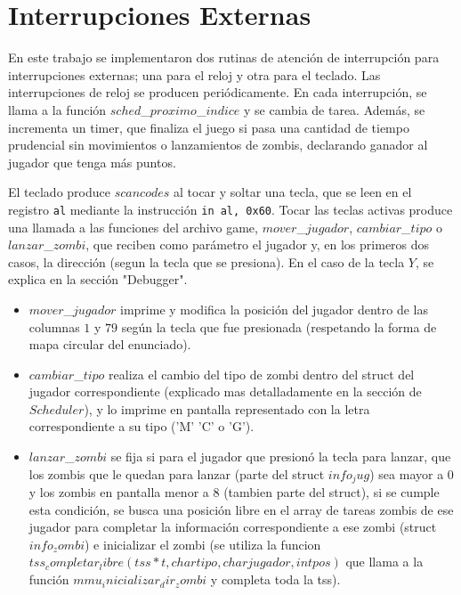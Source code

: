 \documentclass[a4paper]{article}
\begin{document}
\section{Interrupciones Externas} %
En este trabajo se implementaron dos rutinas de atención de interrupción para interrupciones externas; una para el reloj y otra para el teclado.
Las interrupciones de reloj se producen periódicamente. En cada interrupción, se llama a la función $sched$_$proximo$_$indice$ y se cambia de tarea. Además, se incrementa un timer, que finaliza el juego si pasa una cantidad de tiempo prudencial sin movimientos o lanzamientos de zombis, declarando ganador al jugador que tenga más puntos.

El teclado produce $scancodes$ al tocar y soltar una tecla, que se leen en el registro \texttt{al} mediante la instrucción \texttt{in al, 0x60}.
Tocar las teclas activas produce una llamada a las funciones del archivo game, $mover$_$jugador$, $cambiar$_$tipo$ o $lanzar$_$zombi$, que reciben como parámetro el jugador y, en los primeros dos casos, la dirección (segun la tecla que se presiona). En el caso de la tecla $Y$, se explica en la sección "Debugger". 

\begin{itemize}
\item $mover$_$jugador$ imprime y modifica la posición del jugador dentro de las columnas $1$ y $79$ según la tecla que fue presionada (respetando la forma de mapa circular del enunciado).
\item $cambiar$_$tipo$ realiza el cambio del tipo de zombi dentro del struct del jugador correspondiente (explicado mas detalladamente en la sección de $Scheduler$), y lo imprime en pantalla representado con la letra correspondiente a su tipo ('M' 'C' o 'G').
\item $lanzar$_$zombi$ se fija si para el jugador que presionó la tecla para lanzar, que los zombis que le quedan para lanzar (parte del struct $info_jug$) sea mayor a $0$ y los zombis en pantalla menor a $8$ (tambien parte del struct), si se cumple esta condición, se busca una posición libre en el array de tareas zombis de ese jugador para completar la información correspondiente a ese zombi (struct $info_zombi$) e inicializar el zombi (se utiliza la funcion $tss_completar_libre(tss *t, char tipo, char jugador, int pos)$ que llama a la función $mmu_inicializar_dir_zombi$ y completa toda la tss).
\end{itemize}
\end{document}
